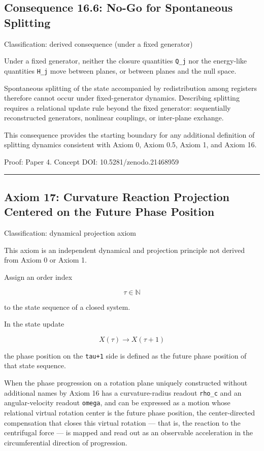 \documentclass[
  a4paper,
]{article}
\begin{document}
\subsection{Consequence 16.6: No-Go for Spontaneous
Splitting}\label{consequence-16.6-no-go-for-spontaneous-splitting}

Classification: derived consequence (under a fixed generator)

Under a fixed generator, neither the closure quantities \texttt{Q\_j}
nor the energy-like quantities \texttt{H\_j} move between planes, or
between planes and the null space.

Spontaneous splitting of the state accompanied by redistribution among
registers therefore cannot occur under fixed-generator dynamics.
Describing splitting requires a relational update rule beyond the fixed
generator: sequentially reconstructed generators, nonlinear couplings,
or inter-plane exchange.

This consequence provides the starting boundary for any additional
definition of splitting dynamics consistent with Axiom 0, Axiom 0.5,
Axiom 1, and Axiom 16.

Proof: Paper 4. Concept DOI: 10.5281/zenodo.21468959

\begin{center}\rule{0.5\linewidth}{0.5pt}\end{center}

\subsection{Axiom 17: Curvature Reaction Projection Centered on the
Future Phase
Position}\label{axiom-17-curvature-reaction-projection-centered-on-the-future-phase-position}

Classification: dynamical projection axiom

This axiom is an independent dynamical and projection principle not
derived from Axiom 0 or Axiom 1.

Assign an order index

\[
\tau\in\mathbb{N}
\]

to the state sequence of a closed system.

In the state update

\[
X(\tau)\longrightarrow X(\tau+1)
\]

the phase position on the \texttt{tau+1} side is defined as the future
phase position of that state sequence.

When the phase progression on a rotation plane uniquely constructed
without additional names by Axiom 16 has a curvature-radius readout
\texttt{rho\_c} and an angular-velocity readout \texttt{omega}, and can
be expressed as a motion whose relational virtual rotation center is the
future phase position, the center-directed compensation that closes this
virtual rotation --- that is, the reaction to the centrifugal force ---
is mapped and read out as an observable acceleration in the
circumferential direction of progression.
\end{document}

